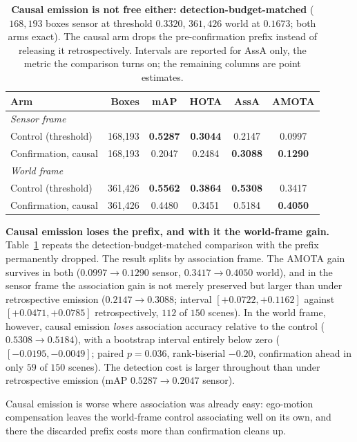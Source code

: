 \begin{table}[tb]
\centering\footnotesize
\setlength{\tabcolsep}{2.5pt}
\begin{tabular}{lrcccc}
\toprule
Arm & Boxes & mAP & HOTA & AssA & AMOTA \\
\midrule
\multicolumn{6}{l}{\emph{Sensor frame}} \\
Control (threshold)  & 168{,}193 & \textbf{0.5287} & \textbf{0.3044} & 0.2147 & 0.0997 \\
Confirmation, causal & 168{,}193 & 0.2047 & 0.2484 & \textbf{0.3088} & \textbf{0.1290} \\
\midrule
\multicolumn{6}{l}{\emph{World frame}} \\
Control (threshold)  & 361{,}426 & \textbf{0.5562} & \textbf{0.3864} & \textbf{0.5308} & 0.3417 \\
Confirmation, causal & 361{,}426 & 0.4480 & 0.3451 & 0.5184 & \textbf{0.4050} \\
\bottomrule
\end{tabular}
\caption{\textbf{Causal emission is not free either: detection-budget-matched}
($168{,}193$ boxes sensor at threshold $0.3320$, $361{,}426$ world at
$0.1673$; both arms exact). The causal arm drops the pre-confirmation prefix
instead of releasing it retrospectively. Intervals are reported for AssA only,
the metric the comparison turns on; the remaining columns are point
estimates.}
\label{tab:causal}
\end{table}

\noindent\textbf{Causal emission loses the prefix, and with it the world-frame
gain.} Table~\ref{tab:causal} repeats the detection-budget-matched comparison
with the prefix permanently dropped. The result splits by association frame.
The AMOTA gain survives in both ($0.0997\!\to\!0.1290$ sensor,
$0.3417\!\to\!0.4050$ world), and in the sensor frame the association gain is
not merely preserved but larger than under retrospective emission
($0.2147\!\to\!0.3088$; interval $[{+}0.0722,{+}0.1162]$ against
$[{+}0.0471,{+}0.0785]$ retrospectively, $112$ of $150$ scenes). In the world
frame, however, causal emission \emph{loses} association accuracy relative to
the control ($0.5308\!\to\!0.5184$), with a bootstrap interval entirely below
zero ($[{-}0.0195,{-}0.0049]$; paired $p{=}0.036$, rank-biserial $-0.20$,
confirmation ahead in only $59$ of $150$ scenes). The detection cost is larger
throughout than under retrospective emission (mAP $0.5287\!\to\!0.2047$
sensor).

Causal emission is worse where association was already easy: ego-motion
compensation leaves the world-frame control associating well on its own, and
there the discarded prefix costs more than confirmation cleans up.

